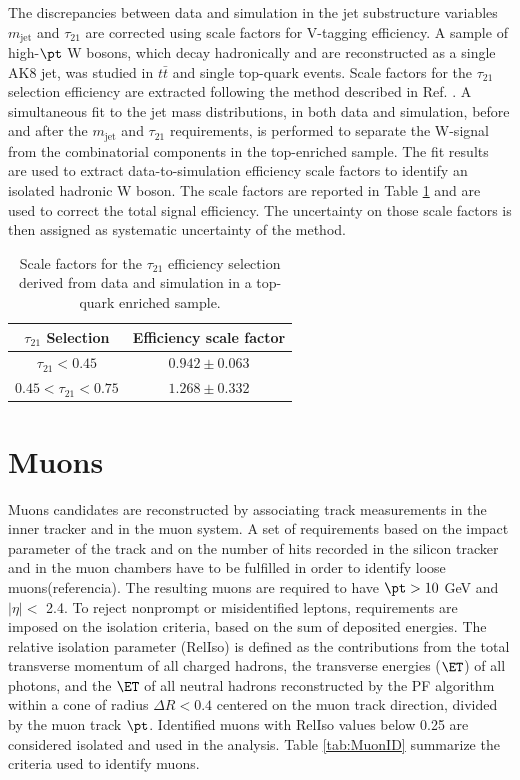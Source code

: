 The discrepancies between data and simulation in the jet substructure variables $m_{\text{jet}}$ and $\tau_{21}$ are corrected using scale factors for V-tagging efficiency.
A sample of high-$\pt$ W bosons, which decay hadronically and are reconstructed as a single AK8 jet, was studied in $t\bar{t}$ and single top-quark events. Scale factors for the $\tau_{21}$ selection efficiency are extracted following the method described in Ref. \cite{Khachatryan2014aa}. A simultaneous fit to the jet mass distributions, in both data and simulation, before and after the $m_{\text{jet}}$ and $\tau_{21}$ requirements, is performed to separate the W-signal from the combinatorial components in the top-enriched sample. The fit results are used to extract data-to-simulation efficiency scale factors to identify an isolated hadronic W boson. The scale factors are reported in Table \ref{tab:VtaggSF} and are used to correct the total signal efficiency. The uncertainty on those scale factors is then assigned as systematic uncertainty of the method.

\begin{table}[h!]
 \centering
  \caption{Scale factors for the $\tau_{21}$ efficiency selection derived from data and simulation in a top-quark enriched sample.}
  \label{tab:VtaggSF}
  \begin{tabular}{cc}
\hline
$\tau_{21}$ Selection                 &          Efficiency scale factor          \\
\hline
$\tau_{21} < 0.45$                    &          $0.942 \pm 0.063$                  \\
$0.45 < \tau_{21} < 0.75$             &          $1.268 \pm 0.332$                   \\
\hline
\end{tabular}
\end{table}



\section{Muons}

Muons candidates are reconstructed by associating track measurements in the inner tracker and in the muon system. A set of requirements based on the impact parameter of the track and on the number of hits recorded in the silicon tracker and in the muon chambers have to be fulfilled in order to identify loose muons(referencia). The resulting muons are required to have $\pt > 10$ GeV and $\left| \eta\right| <$ 2.4. To reject nonprompt or misidentified leptons, requirements are imposed on the isolation criteria, based on the sum of deposited energies. The relative isolation parameter (RelIso) is defined as the contributions from the total transverse momentum of all charged hadrons, the transverse energies ($\ET$)  of all photons, and the $\ET$ of all neutral hadrons reconstructed by the PF algorithm within a cone of radius $\Delta R < 0.4$ centered on the muon  track direction, divided by the muon track $\pt$. Identified muons with RelIso values below 0.25 are considered isolated and used in the analysis. Table \ref{tab:MuonID} summarize the criteria used to identify muons.

